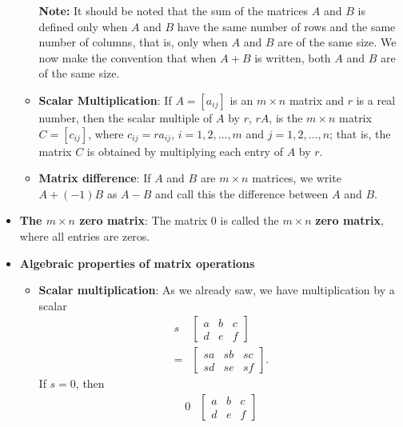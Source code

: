 \documentclass{report}
\begin{document}
\begin{itemize}
\begin{itemize}
                    \bigbreak \noindent 
                    \textbf{Note:} It should be noted that the sum of the matrices $A$ and $B$ is defined only when $A$ and $B$ have the same number of rows and the same number of columns, that is, only when $A$ and $B$ are of the same size. We now make the convention that when $A + B$ is written, both $A$ and $B$ are of the same size.
                \item \textbf{Scalar Multiplication}:
                    If \( A = [a_{ij}] \) is an \( m \times n \) matrix and \( r \) is a real number, then the scalar multiple of \( A \) by \( r \), \( rA \), is the \( m \times n \) matrix \( C = [c_{ij}] \), where \( c_{ij} = r a_{ij}, \, i = 1, 2, \ldots, m \) and \( j = 1, 2, \ldots, n \); that is, the matrix \( C \) is obtained by multiplying each entry of \( A \) by \( r \).
                \item \textbf{Matrix difference}:
                    If \( A \) and \( B \) are \( m \times n \) matrices, we write \( A + (-1)B \) as \( A - B \) and call this the difference between \( A \) and \( B \).
            \end{itemize}
        \item \textbf{The $m\times n$ zero matrix}: The matrix 0 is called the $m\times n$ \textbf{zero matrix}, where all entries are zeros.
        \item \textbf{Algebraic properties of matrix operations}
            \begin{itemize}
                \item \textbf{Scalar multiplication}: As we already saw, we have multiplication by a scalar
                    \begin{align*}
                        s &\begin{bmatrix} a & b & c \\d & e & f \end{bmatrix}  \\
                        = &\begin{bmatrix} sa & sb & sc \\ sd & se & sf \end{bmatrix}
                    .\end{align*}
                    If $s=0$, then 
                    \begin{align*}
                        0&\begin{bmatrix} a & b & c \\d & e & f \end{bmatrix}  \\

\end{align*}
\end{itemize}
\end{itemize}
\end{document}
